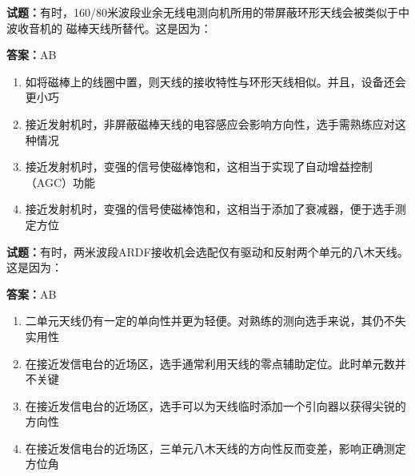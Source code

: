 \documentclass{ctexbook}
\begin{document}


\vspace{1em}

\textbf{试题：}有时，160/80米波段业余无线电测向机所用的带屏蔽环形天线会被类似于中波收音机的
磁棒天线所替代。这是因为： 

\textbf{答案：}AB 

\begin{enumerate}[leftmargin=3em]
  \item 如将磁棒上的线圈中置，则天线的接收特性与环形天线相似。并且，设备还会更小巧 

  \item 接近发射机时，非屏蔽磁棒天线的电容感应会影响方向性，选手需熟练应对这种情况 

  \item 接近发射机时，变强的信号使磁棒饱和，这相当于实现了自动增益控制（AGC）功能 

  \item 接近发射机时，变强的信号使磁棒饱和，这相当于添加了衰减器，便于选手测定方位 

\end{enumerate}





\vspace{1em}

\textbf{试题：}有时，两米波段ARDF接收机会选配仅有驱动和反射两个单元的八木天线。这是因为： 

\textbf{答案：}AB 

\begin{enumerate}[leftmargin=3em]
  \item 二单元天线仍有一定的单向性并更为轻便。对熟练的测向选手来说，其仍不失实用性 

  \item 在接近发信电台的近场区，选手通常利用天线的零点辅助定位。此时单元数并不关键 

  \item 在接近发信电台的近场区，选手可以为天线临时添加一个引向器以获得尖锐的方向性 

  \item 在接近发信电台的近场区，三单元八木天线的方向性反而变差，影响正确测定方位角 

\end{enumerate}



\end{document}
